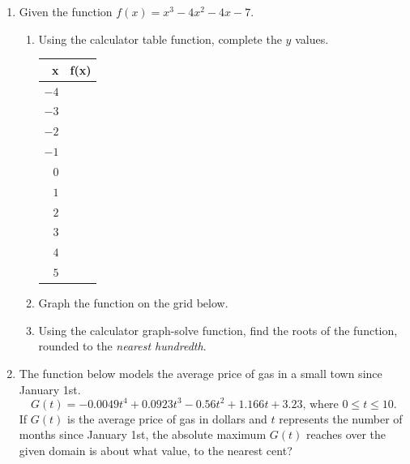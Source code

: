 \documentclass[12pt, oneside]{article}
\begin{document}
\begin{enumerate}
\item Given the function $f(x)=x^3-4x^2-4x-7$. 
\begin{enumerate}
    \item Using the calculator table function, complete the $y$ values.
    \begin{tabular}{r|r}
    x & f(x)\\ 
    \hline 
    $-4$ & \\[5pt]
    $-3$ & \\[5pt]
    $-2$ & \\[5pt]
    $-1$ & \\[5pt]
    $0$ & \\[5pt]
    $1$ & \\[5pt]
    $2$ & \\[5pt]
    $3$ & \\[5pt]
    $4$ & \\[5pt]
    $5$ & \\ 
    \end{tabular}
    \item Graph the function on the grid below.
    \item Using the calculator graph-solve function, find the roots of the function, rounded to the \emph{nearest hundredth}.
\end{enumerate}
\begin{center}
\end{center}


\item The function below models the average price of gas in a small town since January 1st.
\[G(t)=-0.0049t^4 + 0.0923t^3 - 0.56t^2 +1.166t+3.23 \text{, where } 0 \leq t \leq 10.\]
If $G(t)$ is the average price of gas in dollars and $t$ represents the number of months since January 1st, the absolute maximum $G(t)$ reaches over the given domain is about what value, to the nearest cent? %


\end{enumerate}
\end{document}
